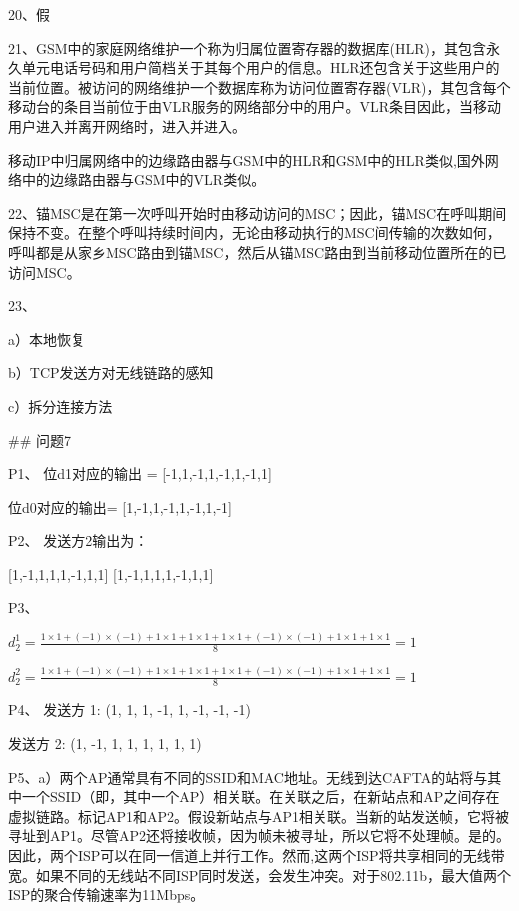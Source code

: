 \documentclass[11pt,UTF8,twoside]{article}
\begin{document}
{		20、假
		
		21、GSM中的家庭网络维护一个称为归属位置寄存器的数据库(HLR)，其包含永久单元电话号码和用户简档关于其每个用户的信息。HLR还包含关于这些用户的当前位置。被访问的网络维护一个数据库称为访问位置寄存器(VLR)，其包含每个移动台的条目当前位于由VLR服务的网络部分中的用户。VLR条目因此，当移动用户进入并离开网络时，进入并进入。
		
		移动IP中归属网络中的边缘路由器与GSM中的HLR和GSM中的HLR类似,国外网络中的边缘路由器与GSM中的VLR类似。
		
		22、锚MSC是在第一次呼叫开始时由移动访问的MSC；因此，锚MSC在呼叫期间保持不变。在整个呼叫持续时间内，无论由移动执行的MSC间传输的次数如何，呼叫都是从家乡MSC路由到锚MSC，然后从锚MSC路由到当前移动位置所在的已访问MSC。
		
		23、
		
		a）本地恢复
		
		b）TCP发送方对无线链路的感知
		
		c）拆分连接方法
		
		\newpage
	\pagestyle{fancy}
	\fancyhf{}  %
	\pagestyle{fancy}
		
		## 问题7 
		
		P1、
		位d1对应的输出 = [-1,1,-1,1,-1,1,-1,1]
		
		位d0对应的输出= [1,-1,1,-1,1,-1,1,-1] 
		
		P2、
		发送方2输出为：
		
		[1,-1,1,1,1,-1,1,1]
		[1,-1,1,1,1,-1,1,1] 
		
		P3、
		
		$d_{2}^{1}=\frac{1 \times 1+(-1)\times(-1)+1 \times 1+1 \times 1+1 \times 1+(-1)\times(-1)+1\times1+1\times1}{8}=1$
		
		$d_{2}^{2}=\frac{1 \times 1+(-1)\times(-1)+1 \times 1+1 \times 1+1 \times 1+(-1)\times(-1)+1\times1+1\times1}{8}=1$
		
		
		P4、
		发送方 1: (1, 1, 1, -1, 1, -1, -1, -1) 
		
		发送方 2: (1, -1, 1, 1, 1, 1, 1, 1) 
		
		
		P5、a）两个AP通常具有不同的SSID和MAC地址。无线到达CAFTA的站将与其中一个SSID（即，其中一个AP）相关联。在关联之后，在新站点和AP之间存在虚拟链路。标记AP1和AP2。假设新站点与AP1相关联。当新的站发送帧，它将被寻址到AP1。尽管AP2还将接收帧，因为帧未被寻址，所以它将不处理帧。是的。因此，两个ISP可以在同一信道上并行工作。然而,这两个ISP将共享相同的无线带宽。如果不同的无线站不同ISP同时发送，会发生冲突。对于802.11b，最大值两个ISP的聚合传输速率为11Mbps。
		
}
\end{document}
